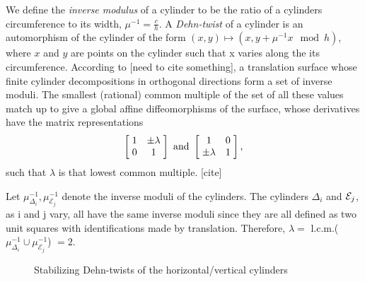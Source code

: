 \documentclass[]{article}
\begin{document}
We define the \emph{inverse modulus} of a cylinder to be the ratio of a cylinders circumference to its width, $\mu^{-1}=\frac{c}{h}$. A \emph{Dehn-twist} of a cylinder is an automorphism of the cylinder of the form  $(x,y)\mapsto(x,y+\mu^{-1} x \mod{h})$, where $x$ and $y$ are points on the cylinder such that x varies along the its circumference. According to [need to cite something], a translation surface whose finite cylinder decompositions in orthogonal directions form a set of inverse moduli. The smallest (rational) common multiple of the set of all these values match up to give a global affine diffeomorphisms of the surface, whose derivatives have the matrix representations
\begin{equation*}
\left[ \hspace{1mm} \begin{matrix}
				1 & \pm \lambda\\
				0 & 1
			\end{matrix}\hspace{1mm}\right] \text{ and }
			\left[ \hspace{1mm} \begin{matrix}
							1 & 0\\
							\pm \lambda & 1
						\end{matrix}\hspace{1mm}\right],
\end{equation*}
such that $\lambda$ is that lowest common multiple. [cite]

Let $\mu^{-1}_{\Delta_i},\mu^{-1}_{\mathcal{E}_j}$ denote the inverse moduli of the cylinders. The cylinders $\Delta_{i}$ and $\small{\mathcal{E}}_j$, as i and j vary, all have the same inverse moduli since they are all defined as two unit squares with identifications made by translation. Therefore, $\lambda=$ l.c.m.($\mu^{-1}_{\Delta_i}\cup\mu^{-1}_{\mathcal{E}_j}$) $=2$.

\begin{figure}[H]
\centering

\caption{Stabilizing Dehn-twists of the horizontal/vertical cylinders}
\label{fig:skew}
\end{figure}
\end{document}

